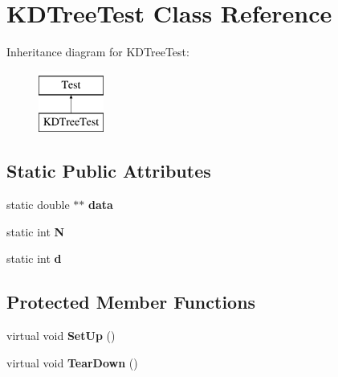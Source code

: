 \hypertarget{classKDTreeTest}{\section{K\+D\+Tree\+Test Class Reference}
\label{classKDTreeTest}
}
Inheritance diagram for K\+D\+Tree\+Test\+:\begin{figure}[H]
\begin{center}
\leavevmode
\includegraphics[height=2.000000cm]{classKDTreeTest}
\end{center}
\end{figure}
\subsection*{Static Public Attributes}
\begin{DoxyCompactItemize}
\item 
\hypertarget{classKDTreeTest_aaac1a9c917141d1867a9beea70b93cb1}{static double $\ast$$\ast$ {\bfseries data}}\label{classKDTreeTest_aaac1a9c917141d1867a9beea70b93cb1}

\item 
\hypertarget{classKDTreeTest_af1ae68702af5f8326e91dd726934c1d9}{static int {\bfseries N}}\label{classKDTreeTest_af1ae68702af5f8326e91dd726934c1d9}

\item 
\hypertarget{classKDTreeTest_ab036748f3456e0b07003aa3f538ad80b}{static int {\bfseries d}}\label{classKDTreeTest_ab036748f3456e0b07003aa3f538ad80b}

\end{DoxyCompactItemize}
\subsection*{Protected Member Functions}
\begin{DoxyCompactItemize}
\item 
\hypertarget{classKDTreeTest_ae64f932fe7a552a1977397f5884e4696}{virtual void {\bfseries Set\+Up} ()}\label{classKDTreeTest_ae64f932fe7a552a1977397f5884e4696}

\item 
\hypertarget{classKDTreeTest_af827d1df2c003a2ae4e755ae2cc83703}{virtual void {\bfseries Tear\+Down} ()}\label{classKDTreeTest_af827d1df2c003a2ae4e755ae2cc83703}

\end{DoxyCompactItemize}
